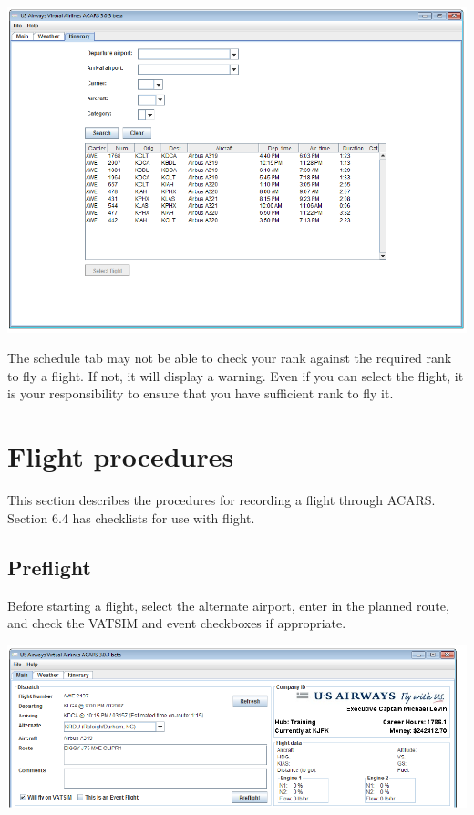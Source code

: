 \documentclass[12pt]{article}
\begin{document}
\begin{center}
\includegraphics[scale=1]{Image12.pdf}
\end{center} 

The schedule tab may not be able to check your rank against the required rank to fly a flight. If not, it will display a warning. Even if you can select the flight, it is your responsibility to ensure that you have sufficient rank to fly it.


\section{Flight procedures}
This section describes the procedures for recording a flight through ACARS. Section 6.4 has checklists for use with flight.

\subsection{Preflight}
Before starting a flight, select the alternate airport, enter in the planned route, and check the VATSIM and event checkboxes if appropriate.

\begin{center}
\includegraphics[scale=1]{Image13.pdf}
\end{center} 
\end{document}

